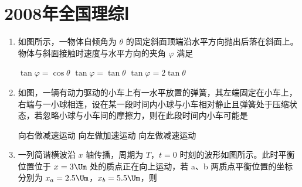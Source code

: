 \documentclass[\gkver]{gaokaozhenti}
\begin{document}
\chapter{2008年全国理综Ⅰ}

\begin{enumerate}
\item
如图所示，一物体自倾角为 $\theta$ 的固定斜面顶端沿水平方向抛出后落在斜面上。物体与斜面接触时速度与水平方向的夹角 $\varphi$ 满足


\fourchoices[answer=D]
{$\tan\varphi=\sin\theta$}
{$\tan\varphi=\cos\theta$}
{$\tan\varphi=\tan\theta$}
{$\tan\varphi=2\tan\theta$}


\item
如图，一辆有动力驱动的小车上有一水平放置的弹簧，其左端固定在小车上，右端与一小球相连，设在某一段时间内小球与小车相对静止且弹簧处于压缩状态，若忽略小球与小车间的摩擦力，则在此段时间内小车可能是


{向右做减速运动}
{向左做加速运动}
{向左做减速运动}


\item
一列简谐横波沿 $x$ 轴传播，周期为 $T$，$t=0$ 时刻的波形如图所示。此时平衡位置位于 $x=3\Um$ 处的质点正在向上运动，若 a、b 两质点平衡位置的坐标分别为 $x_{a}=2.5\Um$，$x_{b}=5.5\Um$，则


\end{enumerate}
\end{document}
